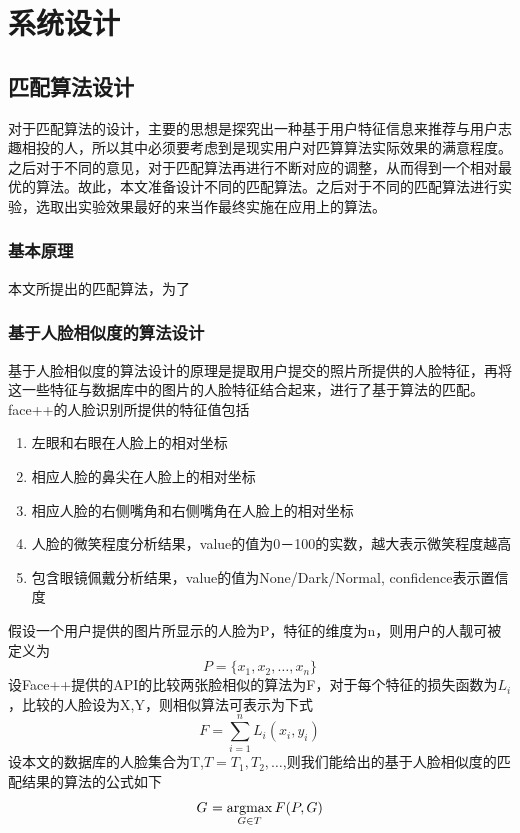 
\chapter{系统设计}

\section{匹配算法设计}
对于匹配算法的设计，主要的思想是探究出一种基于用户特征信息来推荐与用户志趣相投的人，所以其中必须要考虑到是现实用户对匹算算法实际效果的满意程度。之后对于不同的意见，对于匹配算法再进行不断对应的调整，从而得到一个相对最优的算法。故此，本文准备设计不同的匹配算法。之后对于不同的匹配算法进行实验，选取出实验效果最好的来当作最终实施在应用上的算法。
\subsection{基本原理}
本文所提出的匹配算法，为了
\subsection{基于人脸相似度的算法设计}

基于人脸相似度的算法设计的原理是提取用户提交的照片所提供的人脸特征，再将这一些特征与数据库中的图片的人脸特征结合起来，进行了基于算法的匹配。
face++的人脸识别所提供的特征值包括
\begin{enumerate}
\item 左眼和右眼在人脸上的相对坐标
\item 相应人脸的鼻尖在人脸上的相对坐标
\item 相应人脸的右侧嘴角和右侧嘴角在人脸上的相对坐标
\item 人脸的微笑程度分析结果，value的值为0－100的实数，越大表示微笑程度越高
\item 包含眼镜佩戴分析结果，value的值为None/Dark/Normal, confidence表示置信度
\end{enumerate}
假设一个用户提供的图片所显示的人脸为P，特征的维度为n，则用户的人靓可被定义为
\begin{equation*}
P=\{x_1,x_2,\ldots,x_n\}
\end{equation*}
设Face++提供的API的比较两张脸相似的算法为F，对于每个特征的损失函数为$L_i$，比较的人脸设为X,Y，则相似算法可表示为下式
\begin{equation*}
F=\sum_{i=1}^n L_i(x_i, y_i)
\end{equation*}
设本文的数据库的人脸集合为T,$T={T_1,T_2,\ldots}$,则我们能给出的基于人脸相似度的匹配结果的算法的公式如下
\begin{equation*}
G^{\*} = \mathop{\argmax_{G \in T}}{F(P,G)}
\end{equation*}

